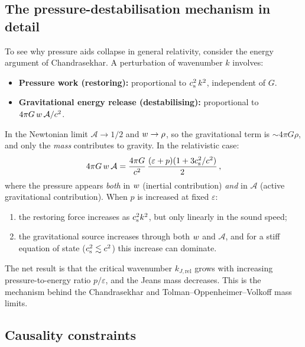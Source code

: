 \subsection{The pressure-destabilisation mechanism in detail}
\label{sec:rel-13-119f}

To see why pressure aids collapse in general relativity, consider
the energy argument of Chandrasekhar.  A perturbation of
wavenumber $k$ involves:
\begin{itemize}
\item \textbf{Pressure work (restoring):} proportional to
  $c_{\mathrm{s}}^{2}\,k^{2}$, independent of $G$.
\item \textbf{Gravitational energy release (destabilising):}
  proportional to $4\pi G\,w\,\mathcal{A}/c^{2}$.
\end{itemize}
In the Newtonian limit $\mathcal{A} \to 1/2$ and $w \to \rho$,
so the gravitational term is $\sim 4\pi G\rho$, and only the
\emph{mass} contributes to gravity.  In the relativistic case:
\begin{equation}
  4\pi G\,w\,\mathcal{A}
  = \frac{4\pi G}{c^{2}}\,
    \frac{(\varepsilon + p)(1 + 3c_{\mathrm{s}}^{2}/c^{2})}{2}\,,
\end{equation}
where the pressure appears \emph{both} in $w$ (inertial
contribution) \emph{and} in $\mathcal{A}$ (active gravitational
contribution).  When $p$ is increased at fixed $\varepsilon$:
\begin{enumerate}
\item the restoring force increases as $c_{\mathrm{s}}^{2}k^{2}$, but only
  linearly in the sound speed;
\item the gravitational source increases through both $w$
  and $\mathcal{A}$, and for a stiff equation of state
  ($c_{\mathrm{s}}^{2} \lesssim c^{2}$) this increase can dominate.
\end{enumerate}
The net result is that the critical wavenumber $k_{J,\mathrm{rel}}$
grows with increasing pressure-to-energy ratio $p/\varepsilon$,
and the Jeans mass decreases.  This is the mechanism behind the
Chandrasekhar and Tolman--Oppenheimer--Volkoff mass limits.

\subsection{Causality constraints}
\label{sec:rel-13-119g}

